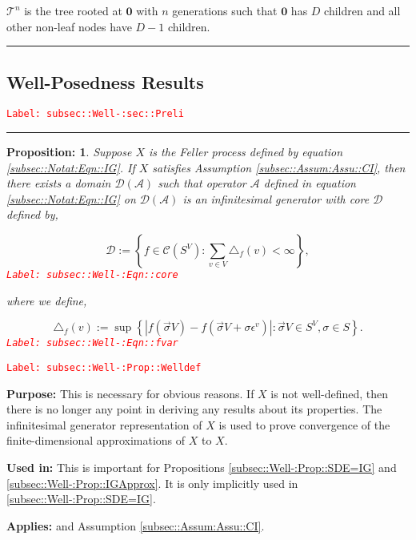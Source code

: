 \documentclass[12pt]{article}
\newcommand{\mc}{\mathcal}
\newcommand{\ep}{\epsilon}
\newcommand{\tr}{\textcolor{red}}
\newcommand{\labe}[1]{\tr{\texttt{Label: #1}}}
\newcommand{\purpose}{\textbf{Purpose: }}
\newcommand{\usein}{\textbf{Used in: }}
\newcommand{\app}{\textbf{Applies: }}
\newcommand{\ind}{\hspace{24pt}}
\newcommand{\lin}{\rule{\linewidth}{0.4 pt}}
\newcommand{\defeq}{:=}								%
\renewcommand{\root}{\mathbf{0}}				%
\renewcommand{\v}{v}							%
\renewcommand{\S}{S}							%
\newcommand{\s}{\sigma}							%
\newcommand{\sv}{\vec{\s}}						%
\newcommand{\ev}[1]{\ep^{#1}}					%
\newcommand{\X}{X}								%
\newcommand{\IG}{\mc{A}}						%
\newcommand{\degr}{D}							%
\newcommand{\tree}{\mc{T}}						%
\newcommand{\core}{\mc{D}}							%
\newcommand{\XState}[1]{\S^{#1}}				%
\newcommand{\cont}{\mc{C}}							%
\newtheorem{prop}[thms]{Proposition: }
\begin{document}
\ind \(\tree^n\) is the tree rooted at \(\root\) with \(n\) generations such that \(\root\) has \(\degr\) children and all other non-leaf nodes have \(\degr-1\) children.

\lin

\subsection{Well-Posedness Results}
\label{subsec::Well-:sec::Preli}\labe{subsec::Well-:sec::Preli}

\rule{\linewidth}{0.4 pt}

\begin{prop}
Suppose \(\X{}{}\) is the Feller process defined by equation \eqref{subsec::Notat:Eqn::IG}. If \(\X{}{}\) satisfies Assumption \ref{subsec::Assum:Assu::CI}, then there exists a domain \(\core(\IG)\) such that operator \(\IG\) defined in equation \eqref{subsec::Notat:Eqn::IG} on \(\mc{D}(\IG)\) is an infinitesimal generator with core \(\core\) defined by,

\begin{equation}
\core \defeq \left\{f \in \cont(\S^ V): \sum_{\v\in V} \triangle_f(\v) < \infty\right\},
\label{subsec::Well-:Eqn::core}
\end{equation}
\labe{subsec::Well-:Eqn::core}

where we define,

\begin{equation}
\triangle_f(\v) \defeq \sup\left\{|f(\sv{}{ V}) - f(\sv{}{ V}+\s\ev{\v})|: \sv{}{ V} \in \S^ V,\s \in \S\right\}.
\label{subsec::Well-:Eqn::fvar}
\end{equation}
\labe{subsec::Well-:Eqn::fvar}

\label{subsec::Well-:Prop::Welldef}
\end{prop}
\labe{subsec::Well-:Prop::Welldef}

\purpose This is necessary for obvious reasons. If \(\X{}{}\) is not well-defined, then there is no longer any point in deriving any results about its properties. The infinitesimal generator representation of \(\X{}{}\) is used to prove convergence of the finite-dimensional approximations of \(\X{}{}\) to \(\X{}{}\).

\usein This is important for Propositions \ref{subsec::Well-:Prop::SDE=IG} and \ref{subsec::Well-:Prop::IGApprox}. It is only implicitly used in \ref{subsec::Well-:Prop::SDE=IG}.

\app \cite[Theorem 3.9]{Lig85} and Assumption \ref{subsec::Assum:Assu::CI}.
\end{document}
